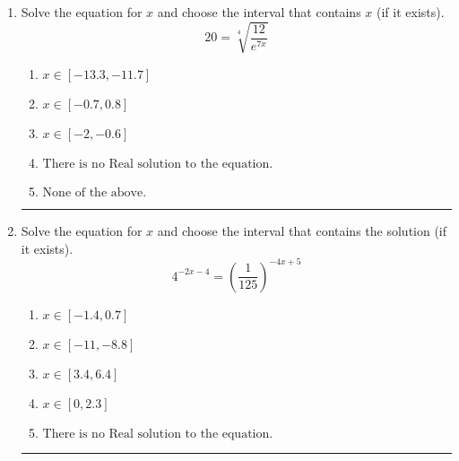 \documentclass[14pt]{extbook}
\newcommand{\litem}[1]{\item#1\hspace*{-1cm}\rule{\textwidth}{0.4pt}}
\begin{document}
\begin{enumerate}
{\begin{enumerate}[label=\Alph*.]
\end{enumerate} }
\litem{
 Solve the equation for $x$ and choose the interval that contains $x$ (if it exists).\[  20 = \sqrt[4]{\frac{12}{e^{7x}}} \]\begin{enumerate}[label=\Alph*.]
\item \( x \in [-13.3, -11.7] \)
\item \( x \in [-0.7, 0.8] \)
\item \( x \in [-2, -0.6] \)
\item \( \text{There is no Real solution to the equation.} \)
\item \( \text{None of the above.} \)

\end{enumerate} }
\litem{
Solve the equation for $x$ and choose the interval that contains the solution (if it exists).\[ 4^{-2x-4} = \left(\frac{1}{125}\right)^{-4x+5} \]\begin{enumerate}[label=\Alph*.]
\item \( x \in [-1.4, 0.7] \)
\item \( x \in [-11, -8.8] \)
\item \( x \in [3.4, 6.4] \)
\item \( x \in [0, 2.3] \)
\item \( \text{There is no Real solution to the equation.} \)

\end{enumerate} }
\end{enumerate}
\end{document}
